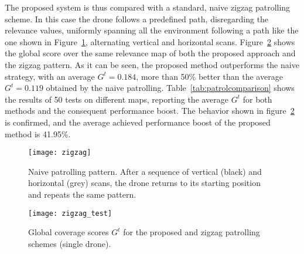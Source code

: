 \documentclass{article}
\begin{document}
The proposed system is thus compared with a standard, naive zigzag patrolling scheme. In this case the drone follows a predefined path, disregarding the relevance values, uniformly spanning all the environment following a path like the one shown in Figure~\ref{fig:zigzag}, alternating vertical and horizontal scans. Figure~\ref{fig:zigzag_test} shows the global score over the same relevance map of both the proposed approach and the zigzag pattern. As it can be seen, the proposed method  outperforms the naive strategy, with an average $G^t = 0.184$, more than 50\% better than the average $G^t=0.119$ obtained by the naive patrolling. Table~\ref{tab:patrolcomparison} shows the results of 50 tests on different maps, reporting the average $G^t$ for both methods and the consequent performance boost. The behavior shown in figure~\ref{fig:zigzag_test} is confirmed, and the average achieved performance boost of the proposed method is 41.95\%.
\begin{figure}
	\centering
	\texttt{[image: zigzag]}
	\caption{Naive patrolling pattern. After a sequence of vertical (black) and horizontal (grey) scans, the drone returns to its starting position and repeats the same pattern.}
	\label{fig:zigzag}
\end{figure}
\begin{figure}
	\centering
	\texttt{[image: zigzag\_test]}
	\caption{Global coverage scores $G^t$ for the proposed and zigzag patrolling schemes (single drone).}
	\label{fig:zigzag_test}
\end{figure}
\end{document}
